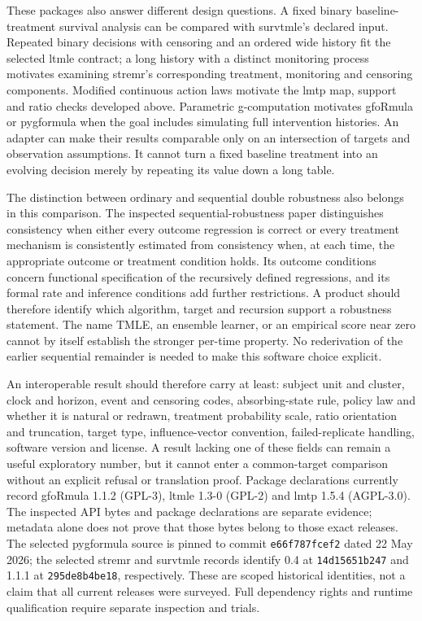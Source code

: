 These packages also answer different design questions. A fixed binary
baseline-treatment survival analysis can be compared with survtmle's
declared input. Repeated binary decisions with censoring and an ordered
wide history fit the selected ltmle contract; a long history with a distinct
monitoring process motivates examining stremr's corresponding treatment,
monitoring and censoring components. Modified continuous action laws motivate
the lmtp map, support and ratio checks developed above. Parametric
g-computation motivates gfoRmula or pygformula when the goal includes
simulating full intervention histories. An adapter can make their results
comparable only on an intersection of targets and observation assumptions.
It cannot turn a fixed baseline treatment into an evolving decision merely
by repeating its value down a long table.

The distinction between ordinary and sequential double robustness also
belongs in this comparison. The inspected sequential-robustness paper
distinguishes consistency when either every outcome regression is correct
or every treatment mechanism is consistently estimated from consistency
when, at each time, the appropriate outcome or treatment condition holds.
Its outcome conditions concern functional specification of the recursively
defined regressions, and its formal rate and inference conditions add
further restrictions. A product should therefore identify which algorithm,
target and recursion support a robustness statement. The name TMLE, an
ensemble learner, or an empirical score near zero cannot by itself establish
the stronger per-time property. No rederivation of the earlier sequential
remainder is needed to make this software choice explicit.
\citep{sequentialdr2018}

An interoperable result should therefore carry at least: subject unit and
cluster, clock and horizon, event and censoring codes, absorbing-state rule,
policy law and whether it is natural or redrawn, treatment probability scale,
ratio orientation and truncation, target type, influence-vector convention,
failed-replicate handling, software version and license. A result lacking one
of these fields can remain a useful exploratory number, but it cannot enter a
common-target comparison without an explicit refusal or translation proof.
Package declarations currently record gfoRmula 1.1.2 (GPL-3), ltmle 1.3-0
(GPL-2) and lmtp 1.5.4 (AGPL-3.0). The inspected API bytes and package
declarations are separate evidence; metadata alone does not prove that those
bytes belong to those exact releases. The selected pygformula source is
pinned to commit \texttt{e66f787fcef2} dated 22 May 2026; the selected
stremr and survtmle records identify 0.4 at \texttt{14d15651b247} and 1.1.1
at \texttt{295de8b4be18}, respectively. These are scoped historical identities,
not a claim that all current releases were surveyed. Full dependency rights
and runtime qualification require separate inspection and trials.
\citep{exec17_s5_paths}

